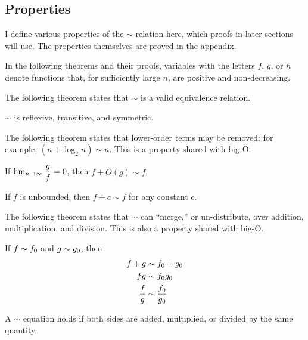 \subsection{Properties}
\label{subsec:AsymptoticProperties}

I define various properties of the $\sim$ relation here, which proofs in later sections will use. The properties themselves are proved in the appendix.

In the following theorems and their proofs, variables with the letters $f$, $g$, or $h$ denote functions that, for sufficiently large $n$, are positive and non-decreasing.

The following theorem states that $\sim$ is a valid equivalence relation.

\begin{theorem}
\label{thm:EquivalenceRelation}
	$\sim$ is reflexive, transitive, and symmetric.
\end{theorem}

The following theorem states that lower-order terms may be removed: for example, $(n + \log_2 n) \sim n$. This is a property shared with big-O.

\begin{theorem}
\label{thm:RemovesLowerOrderTerms}
	If $\lim_{n \to \infty} \dfrac{g}{f} = 0$, then $f + O(g) \sim f$.
\end{theorem}

\begin{corollary}
\label{coro:PlusConstant}
	If $f$ is unbounded, then $f + c \sim f$ for any constant $c$.
\end{corollary}

The following theorem states that $\sim$ can ``merge,'' or un-distribute, over addition, multiplication, and division. This is also a property shared with big-O.

\begin{theorem}
\label{thm:MergesOverOps}
	If $f \sim f_0$ and $g \sim g_0$, then
	\begin{align*}
	f + g &\sim f_0 + g_0\\
	fg &\sim f_0g_0\\
	\frac{f}{g} &\sim \frac {f_0} {g_0}
	\end{align*}
\end{theorem}

\begin{corollary}
\label{coro:BothSides}
	A $\sim$ equation holds if both sides are added, multiplied, or divided by the same quantity.
\end{corollary}


